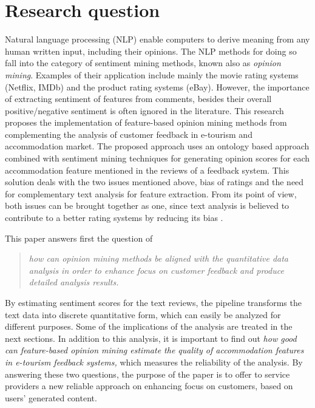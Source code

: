 \section{Research question}
Natural language processing (NLP) enable computers to derive meaning from any human written input, including their opinions. The NLP methods for doing so fall into the category of sentiment mining methods, known also as \textit{opinion mining}. Examples of their application include mainly the movie rating systems (Netflix, IMDb) and the product rating systems (eBay). However, the importance of extracting sentiment of features from  comments, besides their overall positive/negative sentiment is often ignored in the literature. This research proposes the implementation of feature-based opinion mining methods from complementing the analysis of customer feedback in e-tourism and accommodation market. The proposed approach uses an ontology based approach combined with sentiment mining techniques for generating opinion scores for each accommodation feature mentioned in the reviews of a feedback system. This solution deals with the two issues mentioned above, bias of ratings and the need for complementary text analysis for feature extraction. From its point of view, both issues can be brought together as one, since text analysis is believed to contribute to a better rating systems by reducing its bias \cite{fradkin2016bias}.

This paper answers first the question of
\begin{quote}
 \textit{how can opinion mining methods be aligned with the quantitative data analysis in order to enhance focus on customer feedback and produce detailed analysis results.}
\end{quote}
 By estimating sentiment scores for the text reviews, the pipeline transforms the text data into discrete quantitative form, which can easily be analyzed for different purposes. Some of the implications of the analysis are treated in the next sections. In addition to this analysis, it is important to find out  \textit{how good can feature-based opinion mining estimate the quality of accommodation features in e-tourism feedback systems,} which measures the reliability of the analysis. By answering these two questions, the purpose of the paper is to offer to service providers a new reliable approach on enhancing focus on customers, based on users' generated content.

